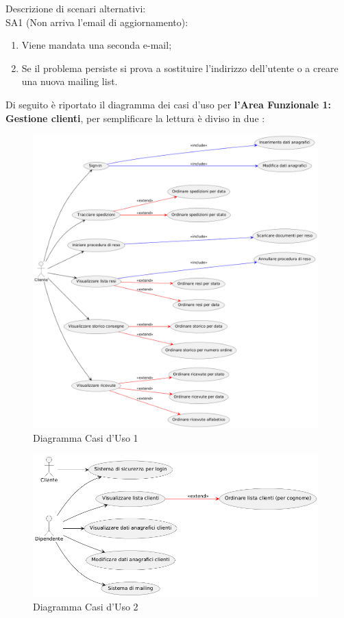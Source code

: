 Descrizione di scenari alternativi: \\
SA1 (Non arriva l'email di aggiornamento): 
\begin{enumerate}
  \item Viene mandata una seconda e-mail;
  \item Se il problema persiste si prova a sostituire l'indirizzo dell'utente o a creare una nuova mailing list.
\end{enumerate} 
Di seguito è riportato il diagramma dei casi d'uso per \textbf{l'Area Funzionale 1: Gestione clienti}, per semplificare la lettura è diviso in due :

\begin{figure}[H]
  \centering
  \includegraphics[width=11cm]{assets/usecase_clienti.png}
  \caption{Diagramma Casi d'Uso 1}
\end{figure}
\begin{figure}[H]
  \centering
  \includegraphics[width=11cm]{assets/usecase_clienti_2.png}
  \caption{Diagramma Casi d'Uso 2}
\end{figure}

